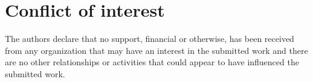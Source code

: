 %
\section*{Conflict of interest}
The authors declare that no support, financial or otherwise, has been received from any organization that may have an interest in the submitted work and there are no other relationships or activities that could appear to have influenced the submitted work.




%
%



